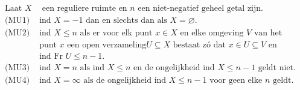 \documentclass[preview]{standalone}
\begin{document}
\begin{align*}
\text{Laat }X&\text{ een reguliere ruimte en }n\text{ een niet-negatief geheel getal zijn.}
                           \\\text{(MU1) }&\text{ind }X=-1\text{ dan en slechts dan als }X=\varnothing.
                           \\\text{(MU2) }&\text{ind }X\leq n\text{ als er voor elk punt }x\in X\text{ en elke omgeving }V\text{ van het}
                                        \\&\text{punt }x\text{ een open verzameling}U\subseteq X\text{ bestaat zó dat }x\in U\subseteq V\text{ en}
                                        \\&\text{ind Fr }U\leq n-1.
                           \\\text{(MU3) }&\text{ind }X=n\text{ als ind }X\leq n\text{ en de ongelijkheid ind }X\leq n-1\text{ geldt niet.}
                           \\\text{(MU4) }&\text{ind }X=\infty\text{ als de ongelijkheid ind }X\leq n-1\text{ voor geen elke }n\text{ geldt.}
\end{align*}
\end{document}
